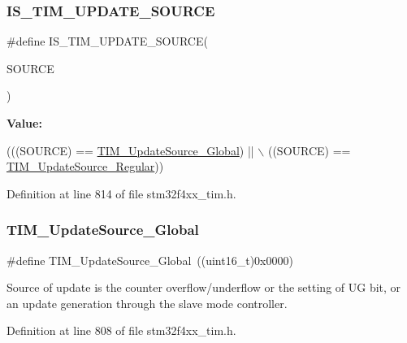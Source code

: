 \subsubsection{\texorpdfstring{I\+S\+\_\+\+T\+I\+M\+\_\+\+U\+P\+D\+A\+T\+E\+\_\+\+S\+O\+U\+R\+CE}{IS\_TIM\_UPDATE\_SOURCE}}
{\footnotesize\ttfamily \#define I\+S\+\_\+\+T\+I\+M\+\_\+\+U\+P\+D\+A\+T\+E\+\_\+\+S\+O\+U\+R\+CE(\begin{DoxyParamCaption}\item[{}]{S\+O\+U\+R\+CE }\end{DoxyParamCaption})}

{\bfseries Value\+:}
\begin{DoxyCode}
(((SOURCE) == \hyperlink{group___t_i_m___update___source_ga32c67bc3f8211a2c7b44ee9fe1523875}{TIM\_UpdateSource\_Global}) || \(\backslash\)
                                      ((SOURCE) == \hyperlink{group___t_i_m___update___source_ga6f50423cdb011137ae8cd303ccd2080c}{TIM\_UpdateSource\_Regular}))
\end{DoxyCode}


Definition at line 814 of file stm32f4xx\+\_\+tim.\+h.

\mbox{\label{group___t_i_m___update___source_ga32c67bc3f8211a2c7b44ee9fe1523875}} 
\subsubsection{\texorpdfstring{T\+I\+M\+\_\+\+Update\+Source\+\_\+\+Global}{TIM\_UpdateSource\_Global}}
{\footnotesize\ttfamily \#define T\+I\+M\+\_\+\+Update\+Source\+\_\+\+Global~((uint16\+\_\+t)0x0000)}

Source of update is the counter overflow/underflow or the setting of UG bit, or an update generation through the slave mode controller. 

Definition at line 808 of file stm32f4xx\+\_\+tim.\+h.

\mbox{\label{group___t_i_m___update___source_ga6f50423cdb011137ae8cd303ccd2080c}} 
